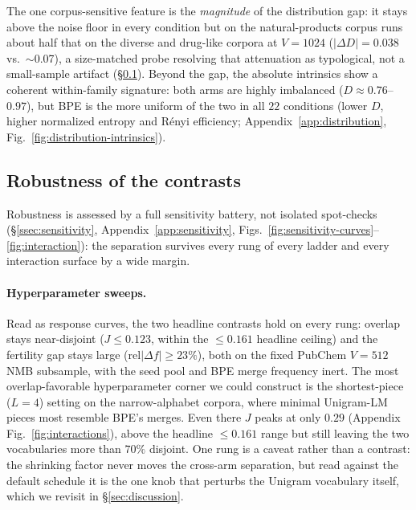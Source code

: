 \documentclass{article}
\begin{document}
The one corpus-sensitive feature is the \emph{magnitude} of the distribution
gap: it stays above the noise floor in every condition but on the
natural-products corpus runs about half that on the diverse and drug-like
corpora at $V{=}1024$ ($|\Delta D| = 0.038$ vs.\ $\sim$0.07), a size-matched
probe resolving that attenuation as typological, not a small-sample artifact
(\S\ref{ssec:r-extras}). Beyond the gap, the absolute intrinsics show a coherent
within-family signature: both arms are highly imbalanced ($D \approx
0.76$--$0.97$), but BPE is the more uniform of the two in all $22$ conditions
(lower $D$, higher normalized entropy and R\'enyi efficiency;
Appendix~\ref{app:distribution}, Fig.~\ref{fig:distribution-intrinsics}).

\subsection{Robustness of the contrasts}\label{ssec:r-extras}

Robustness is assessed by a full sensitivity battery, not isolated
spot-checks (\S\ref{ssec:sensitivity}, Appendix~\ref{app:sensitivity},
Figs.~\ref{fig:sensitivity-curves}--\ref{fig:interaction}): the separation
survives every rung of every ladder and every interaction surface by a wide
margin.

\paragraph{Hyperparameter sweeps.}
Read as response curves, the two headline contrasts hold on every rung:
overlap stays near-disjoint ($J \le 0.123$, within the $\le 0.161$ headline
ceiling) and the fertility gap stays large ($\mathrm{rel}|\Delta f| \ge 23\%$),
both on the fixed PubChem $V{=}512$ NMB subsample, with the seed pool and BPE
merge frequency inert. The most overlap-favorable hyperparameter corner we could construct is the
shortest-piece ($L{=}4$) setting on the narrow-alphabet corpora, where minimal
Unigram-LM pieces most resemble BPE's merges. Even there $J$ peaks at only $0.29$
(Appendix Fig.~\ref{fig:interactions}), above the
headline $\le 0.161$ range but still leaving the two vocabularies more than
$70\%$ disjoint. One rung is a
caveat rather than a contrast: the shrinking factor never moves the cross-arm
separation, but read against the default schedule it is the one knob that
perturbs the Unigram vocabulary itself, which we revisit in
\S\ref{sec:discussion}.
\end{document}
